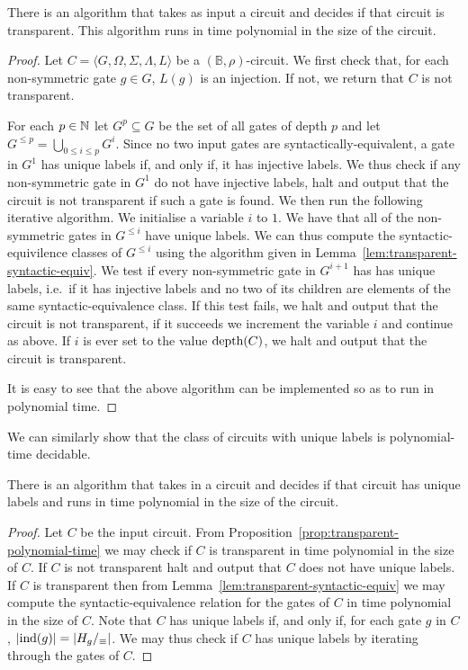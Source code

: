 \documentclass[../paper.tex]{subfiles}
\begin{document}
\begin{prop}
  There is an algorithm that takes as input a circuit and decides if that
  circuit is transparent. This algorithm runs in time polynomial in the size of
  the circuit.
  \label{prop:transparent-polynomial-time}
\end{prop}
\begin{proof}
  Let $C = \langle G, \Omega, \Sigma, \Lambda, L \rangle$ be a $(\mathbb{B},
  \rho)$-circuit. We first check that, for each non-symmetric gate $g \in G$,
  $L(g)$ is an injection. If not, we return that $C$ is not transparent.

  For each $p \in \mathbb{N}$ let $G^p \subseteq G$ be the set of all gates of depth
  $p$ and let $G^{\leq p} = \bigcup_{0 \leq i \leq p}G^i$. Since no two input
  gates are syntactically-equivalent, a gate in $G^1$ has unique labels if, and
  only if, it has injective labels. We thus check if any non-symmetric gate in
  $G^1$ do not have injective labels, halt and output that the circuit is not
  transparent if such a gate is found. We then run the following iterative
  algorithm. We initialise a variable $i$ to $1$. We have that all of the
  non-symmetric gates in $G^{\leq i}$ have unique labels. We can thus compute
  the syntactic-equivilence classes of $G^{\leq i}$ using the algorithm given in
  Lemma~\ref{lem:transparent-syntactic-equiv}. We test if every non-symmetric
  gate in $G^{i+1}$ has has unique labels, i.e.\ if it has injective labels and
  no two of its children are elements of the same syntactic-equivalence class.
  If this test fails, we halt and output that the circuit is not transparent, if
  it succeeds we increment the variable $i$ and continue as above. If $i$ is
  ever set to the value $\text{depth}(C)$, we halt and output that the circuit is
  transparent.

  It is easy to see that the above algorithm can be implemented so as to run in
  polynomial time.
\end{proof}

We can similarly show that the class of circuits with unique labels is
polynomial-time decidable.

\begin{cor}
  There is an algorithm that takes in a circuit and decides if that circuit has
  unique labels and runs in time polynomial in the size of the circuit.
\end{cor}
\begin{proof}
  Let $C$ be the input circuit. From
  Proposition~\ref{prop:transparent-polynomial-time} we may check if $C$ is
  transparent in time polynomial in the size of $C$. If $C$ is not transparent
  halt and output that $C$ does not have unique labels. If $C$ is transparent
  then from Lemma~\ref{lem:transparent-syntactic-equiv} we may compute the
  syntactic-equivalence relation for the gates of $C$ in time polynomial in the
  size of $C$. Note that $C$ has unique labels if, and only if, for each gate
  $g$ in $C$, $\vert \text{\upshape ind}(g) \vert = \vert H_g /_\equiv \vert$. We may thus
  check if $C$ has unique labels by iterating through the gates of $C$. 
\end{proof}
\end{document}
